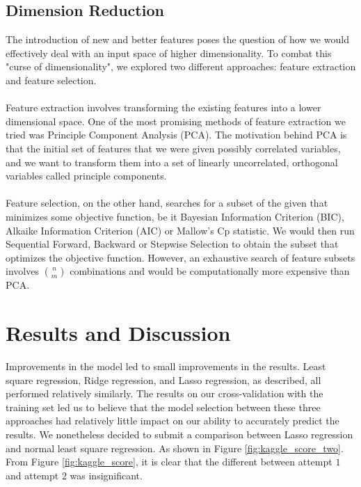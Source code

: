\documentclass[letterpaper]{article}
\begin{document}
\subsection{Dimension Reduction}

The introduction of new and better features poses the question of how we would effectively deal with an input space of higher dimensionality. To combat this "curse of dimensionality", we explored two different approaches: feature extraction and feature selection.\\
\\
\noindent Feature extraction involves transforming the existing features into a lower dimensional space. One of the most promising methods of feature extraction we tried was Principle Component Analysis (PCA). The motivation behind PCA is that the initial set of features that we were given possibly correlated variables, and we want to transform them into a set of linearly uncorrelated, orthogonal variables called principle components. \\
\\
Feature selection, on the other hand, searches for a subset of the given that minimizes some objective function, be it Bayesian Information Criterion (BIC), Alkaike Information Criterion (AIC) or Mallow's Cp statistic. We would then run Sequential Forward, Backward or Stepwise Selection to obtain the subset that optimizes the objective function. However, an exhaustive search of feature subsets involves $\binom{n}{m}$ combinations and would be computationally more expensive than PCA.

\section{Results and Discussion}
Improvements in the model led to small improvements in the results. Least square regression, Ridge regression, and Lasso regression, as described, all performed relatively similarly. The results on our cross-validation with the training set led us to believe that the model selection between these three approaches had relatively little impact on our ability to accurately predict the results. We nonetheless decided to submit a comparison between Lasso regression and normal least square regression. As shown in Figure \ref{fig:kaggle_score_two}. 
\noindent From Figure \ref{fig:kaggle_score}, it is clear that the different between attempt $1$ and attempt $2$ was insignificant.
\end{document}
